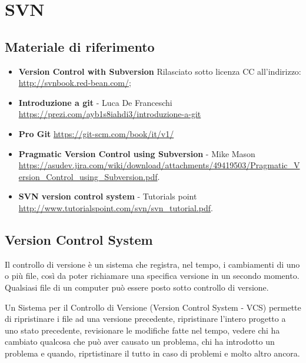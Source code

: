 \chapter{SVN}

\section*{Materiale di riferimento}

\begin{itemize}

\item \textbf{Version Control with Subversion} Rilasciato sotto licenza CC all'indirizzo: \url{http://svnbook.red-bean.com/};

\item \textbf{Introduzione a git} - Luca De Franceschi \url{https://prezi.com/ayb1s8iahdi3/introduzione-a-git}
 \item \textbf{Pro Git} \url{https://git-scm.com/book/it/v1/}
\item \textbf{Pragmatic Version Control using Subversion} - Mike Mason 
\url{https://asudev.jira.com/wiki/download/attachments/49419503/Pragmatic_Version_Control_using_Subversion.pdf}.

\item \textbf{SVN version control system} - Tutorials point \url{http://www.tutorialspoint.com/svn/svn_tutorial.pdf}.

\end{itemize}

\section{Version Control System}
Il controllo di versione è un sistema che registra, nel tempo, i cambiamenti di uno o più file, così da poter richiamare una specifica versione in un secondo momento. Qualsiasi file di un computer può essere posto sotto controllo di versione.

Un Sistema per il Controllo di Versione (Version Control System - VCS)  permette di ripristinare i file ad una versione precedente, ripristinare l'intero progetto a uno stato precedente, revisionare le modifiche fatte nel tempo, vedere chi ha cambiato qualcosa che può aver causato un problema, chi ha introdotto un problema e quando, riprtistinare il tutto in caso di problemi e molto altro ancora. 

